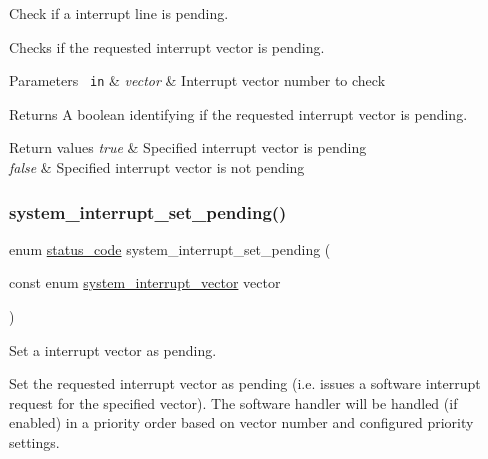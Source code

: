 Check if a interrupt line is pending. 

Checks if the requested interrupt vector is pending.


\begin{DoxyParams}[1]{Parameters}
\mbox{\texttt{ in}}  & {\em vector} & Interrupt vector number to check\\
\hline
\end{DoxyParams}
\begin{DoxyReturn}{Returns}
A boolean identifying if the requested interrupt vector is pending.
\end{DoxyReturn}

\begin{DoxyRetVals}{Return values}
{\em true} & Specified interrupt vector is pending \\
\hline
{\em false} & Specified interrupt vector is not pending \\
\hline
\end{DoxyRetVals}
\mbox{\label{group__asfdoc__sam0__system__interrupt__group_ga03184d235f73957b4226205219783ba3}} 
\subsubsection{\texorpdfstring{system\_interrupt\_set\_pending()}{system\_interrupt\_set\_pending()}}
{\footnotesize\ttfamily enum \mbox{\hyperlink{group__group__sam0__utils__status__codes_ga751c892e5a46b8e7d282085a5a5bf151}{status\+\_\+code}} system\+\_\+interrupt\+\_\+set\+\_\+pending (\begin{DoxyParamCaption}\item[{const enum \mbox{\hyperlink{group__asfdoc__sam0__system__interrupt__group_ga43378e6222cc05290c1a0c6a9ba125cf}{system\+\_\+interrupt\+\_\+vector}}}]{vector }\end{DoxyParamCaption})}



Set a interrupt vector as pending. 

Set the requested interrupt vector as pending (i.\+e. issues a software interrupt request for the specified vector). The software handler will be handled (if enabled) in a priority order based on vector number and configured priority settings.


